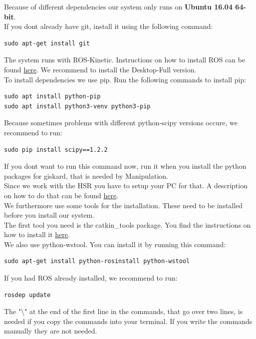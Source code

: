 \documentclass[main.tex]{subfiles}
\begin{document}
	Because of different dependencies our system only runs on \textbf{Ubuntu 16.04 64-bit}.\\
	If you dont already have git, install it using the following command:\\
	\begin{lstlisting}
sudo apt-get install git
\end{lstlisting}
	The system runs with ROS-Kinetic. Instructions on how to install ROS can be found \href{http://wiki.ros.org/kinetic/Installation/Ubuntu}{here}. We recommend to install the Desktop-Full version.\\
	To install dependencies we use pip. Run the following commands to install pip:
	\begin{lstlisting}
sudo apt install python-pip
sudo apt install python3-venv python3-pip
\end{lstlisting}
Because sometimes problems with different python-scipy versions occure, we recommend to run:\\
\begin{lstlisting}
sudo pip install scipy==1.2.2
\end{lstlisting}
If you dont want to run this command now, run it when you install the python packages for giskard, that is needed by Manipulation.\\
	Since we work with the HSR you have to setup your PC for that.
	A description on how to do that can be found \href{https://docs.hsr.io/manual_en/howto/pc_install.html}{here}.\\
	We furthermore use some tools for the installation. These need to be installed before you install our system.\\
	The first tool you need is the catkin\_tools package. You find the instructions on how to install it \href{https://catkin-tools.readthedocs.io/en/latest/installing.html}{here}.\\
	We also use python-wstool.
	You can install it by running this command:
	\begin{lstlisting}
sudo apt-get install python-rosinstall python-wstool
\end{lstlisting}

If you had ROS already installed, we recommend to run:
\begin{lstlisting}
rosdep update
\end{lstlisting}
The "\textbackslash" at the end of the first line in the commands, that go over two lines, is needed if you copy the commands into your terminal. If you write the commands manually they are not needed.
	
\end{document}
